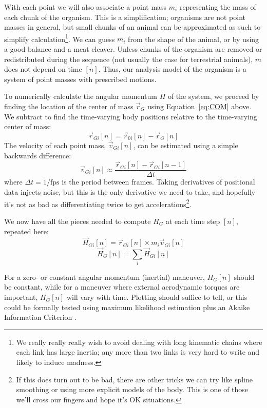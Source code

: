 With each point we will also associate a point mass $m_i$ representing the mass of each chunk of the organism. This is a simplification; organisms are not point masses in general, but small chunks of an animal can be approximated as such to simplify calculation\footnote{We really really really wish to avoid dealing with long kinematic chains where each link has large inertia; any more than two links is very hard to write and likely to induce madness.}. We can guess $m_i$ from the shape of the animal, or by using a good balance and a meat cleaver. Unless chunks of the organism are removed or redistributed during the sequence (not usually the case for terrestrial animals), $m$ does not depend on time $[n]$. Thus, our analysis model of the organism is a system of point masses with prescribed motions.  

To numerically calculate the angular momentum $H$ of the system, we proceed by finding the location of the center of mass $\vec{r}_G$ using Equation~\ref{eq:COM} above. We subtract to find the time-varying body positions relative to the time-varying center of mass:
\begin{equation}
\vec{r}_{Gi}[n] = \vec{r}_{0i}[n]-\vec{r}_{G}[n]
\label{eq:rg}
\end{equation}
The velocity of each point mass, $\vec{v}_{Gi}[n]$, can be estimated using a simple backwards difference:
\begin{equation}
\vec{v}_{Gi}[n] \approx \frac{\vec{r}_{Gi}[n] - \vec{r}_{Gi}[n-1]}{\Delta t}
\end{equation}
where $\Delta t = 1/\mbox{fps}$ is the period between frames. Taking derivatives of positional data injects noise, but this is the only derivative we need to take, and hopefully it's not as bad as differentiating twice to get accelerations\footnote{If this does turn out to be bad, there are other tricks we can try like spline smoothing or using more explicit models of the body. This is one of those we'll cross our fingers and hope it's OK situations.}. 

We now have all the pieces needed to compute $H_G$ at each time step $[n]$, repeated here: 
\begin{equation}
\vec{H}_{Gi}[n] = \vec{r}_{Gi}[n] \times m_i \vec{v}_{Gi}[n]
\end{equation}
\begin{equation}
\vec{H}_{G}[n] = \sum_i \vec{H}_{Gi}[n]
\end{equation}

For a zero- or constant angular momentum (inertial) maneuver, $H_G[n]$ should be constant, while for a maneuver where external aerodynamic torques are important, $H_G[n]$ will vary with time. Plotting should suffice to tell, or this could be formally tested using maximum likelihood estimation plus an Akaike Information Criterion \cite{notes:tdd}. 

